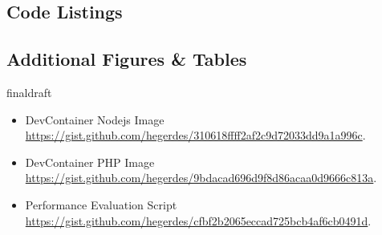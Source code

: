 \documentclass[12pt, a4paper]{article}
\def\draft{draft}
\def\status{final}
\begin{document}


\subsection{Code Listings}


% 
\newpage

\subsection{Additional Figures \& Tables}
\ifx\status\draft{}
    
    \newpage
\fi



\listoffigures
\listoftables
\lstlistoflistings{}
\vspace{-0.5cm}
\begin{itemize}
    \setlength\itemsep{0em}
    \item DevContainer Nodejs Image  \\ \href{https://gist.github.com/hegerdes/310618ffff2af2c9d72033dd9a1a996c}{https://gist.github.com/hegerdes/310618ffff2af2c9d72033dd9a1a996c}.
    \item DevContainer PHP Image  \\ \href{https://gist.github.com/hegerdes/9bdacad696d9f8d86acaa0d9666c813a}{https://gist.github.com/hegerdes/9bdacad696d9f8d86acaa0d9666c813a}.
    \item Performance Evaluation Script  \\ \href{https://gist.github.com/hegerdes/cfbf2b2065eccad725bcb4af6cb0491d}{https://gist.github.com/hegerdes/cfbf2b2065eccad725bcb4af6cb0491d}.
\end{itemize}

\newpage


% 
\end{document}
